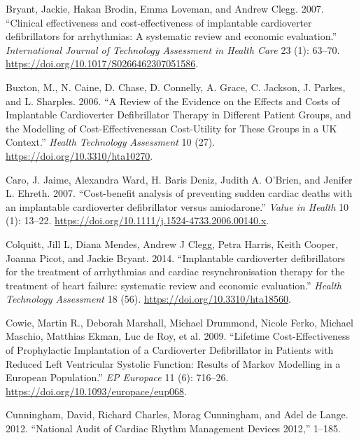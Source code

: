 \documentclass[
]{article}
\newlength{\cslhangindent}
\newlength{\cslentryspacingunit} %
\newenvironment{CSLReferences}[2] %
 {%
  \setlength{\parindent}{0pt}
  \ifodd #1
  \let\oldpar\par
  \def\par{\hangindent=\cslhangindent\oldpar}
  \fi
  \setlength{\parskip}{#2\cslentryspacingunit}
 }%
 {}
\begin{document}
\hypertarget{refs}{}
\begin{CSLReferences}{1}{0}
\leavevmode{}%
Bryant, Jackie, Hakan Brodin, Emma Loveman, and Andrew Clegg. 2007.
{``{Clinical effectiveness and cost-effectiveness of implantable
cardioverter defibrillators for arrhythmias: A systematic review and
economic evaluation}.''} \emph{International Journal of Technology
Assessment in Health Care} 23 (1): 63--70.
\url{https://doi.org/10.1017/S0266462307051586}.

\leavevmode{}%
Buxton, M., N. Caine, D. Chase, D. Connelly, A. Grace, C. Jackson, J.
Parkes, and L. Sharples. 2006. {``A Review of the Evidence on the
Effects and Costs of Implantable Cardioverter Defibrillator Therapy in
Different Patient Groups, and the Modelling of Cost-Effectivenessan
Cost-Utility for These Groups in a UK Context.''} \emph{Health
Technology Assessment} 10 (27). \url{https://doi.org/10.3310/hta10270}.

\leavevmode{}%
Caro, J. Jaime, Alexandra Ward, H. Baris Deniz, Judith A. O'Brien, and
Jenifer L. Ehreth. 2007. {``{Cost-benefit analysis of preventing sudden
cardiac deaths with an implantable cardioverter defibrillator versus
amiodarone}.''} \emph{Value in Health} 10 (1): 13--22.
\url{https://doi.org/10.1111/j.1524-4733.2006.00140.x}.

\leavevmode{}%
Colquitt, Jill L, Diana Mendes, Andrew J Clegg, Petra Harris, Keith
Cooper, Joanna Picot, and Jackie Bryant. 2014. {``{Implantable
cardioverter defibrillators for the treatment of arrhythmias and cardiac
resynchronisation therapy for the treatment of heart failure: systematic
review and economic evaluation}.''} \emph{Health Technology Assessment}
18 (56). \url{https://doi.org/10.3310/hta18560}.

\leavevmode{}%
Cowie, Martin R., Deborah Marshall, Michael Drummond, Nicole Ferko,
Michael Maschio, Matthias Ekman, Luc de Roy, et al. 2009. {``Lifetime
Cost-Effectiveness of Prophylactic Implantation of a Cardioverter
Defibrillator in Patients with Reduced Left Ventricular Systolic
Function: Results of Markov Modelling in a European Population.''}
\emph{EP Europace} 11 (6): 716--26.
\url{https://doi.org/10.1093/europace/eup068}.

\leavevmode{}%
Cunningham, David, Richard Charles, Morag Cunningham, and Adel de Lange.
2012. {``{National Audit of Cardiac Rhythm Management Devices 2012},''}
1--185.


\end{CSLReferences}
\end{document}
